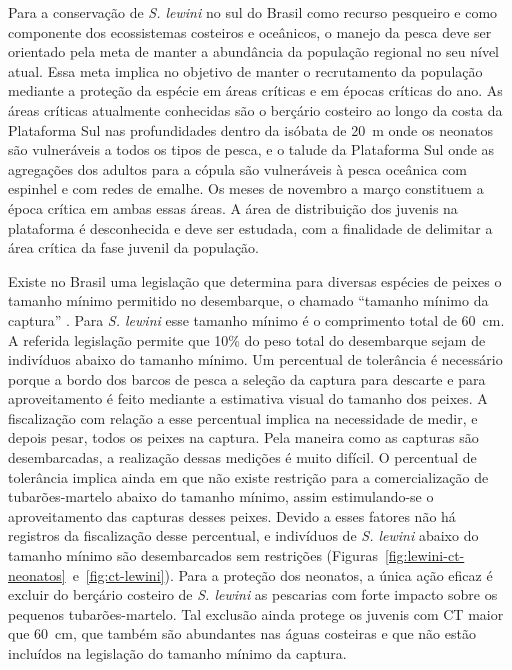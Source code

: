\documentclass[a4paper,11pt,twoside,showtrims,onecolumn,openright,final]{memoir}
\begin{document}
Para a conservação de \emph{S. lewini} no sul do Brasil como recurso pesqueiro e como componente 
dos ecossistemas costeiros e oceânicos, o manejo da pesca deve ser orientado pela meta de manter 
a abundância da população regional no seu nível atual. Essa meta implica no objetivo de  manter 
o recrutamento da população  mediante a proteção da espécie em áreas críticas e em épocas críticas do ano. 
As áreas críticas  atualmente conhecidas são o berçário costeiro ao longo da costa da Plataforma Sul 
nas profundidades dentro da isóbata de 20~m onde os neonatos são vulneráveis a todos os tipos de pesca, 
e o talude da Plataforma Sul onde as agregações dos adultos para a cópula são vulneráveis à pesca oceânica 
com espinhel e com redes de emalhe. Os meses de novembro a março constituem a época crítica em ambas 
essas áreas. A área de distribuição dos juvenis na plataforma é desconhecida e deve ser estudada, 
com a finalidade de delimitar a área crítica da fase juvenil da população.

Existe no Brasil uma legislação que determina para diversas espécies de peixes o tamanho mínimo 
permitido no desembarque, o chamado ``tamanho mínimo da captura'' \citep{ibama2003c}. 
Para \emph{S. lewini} esse tamanho mínimo é o comprimento total de 60~cm. 
A referida legislação permite que 10\% do peso total do desembarque sejam de indivíduos 
abaixo do tamanho mínimo. Um percentual de tolerância é necessário porque a bordo dos barcos 
de pesca a seleção da captura para descarte e para aproveitamento é feito mediante a estimativa visual 
do tamanho dos peixes. A fiscalização com relação a esse percentual implica na necessidade de medir, 
e depois pesar, todos os peixes na captura. Pela maneira como as capturas são desembarcadas, 
a realização dessas medições é muito difícil. O percentual de tolerância implica ainda em que não 
existe restrição para a comercialização de tubarões-martelo abaixo do tamanho mínimo, assim estimulando-se 
o aproveitamento das capturas desses peixes. Devido a esses fatores não há  registros da fiscalização 
desse percentual, e indivíduos de \emph{S. lewini}  abaixo do tamanho mínimo são desembarcados 
sem restrições (Figuras~\ref{fig:lewini-ct-neonatos}~e~\ref{fig:ct-lewini}). %
Para a proteção dos neonatos, a única ação eficaz é excluir do berçário costeiro de \emph{S. lewini} 
as pescarias com forte impacto sobre os pequenos tubarões-martelo. Tal exclusão ainda protege 
os juvenis com CT maior que 60~cm, que também são abundantes nas águas costeiras e que não estão 
incluídos na legislação do tamanho mínimo da captura.
\end{document}
